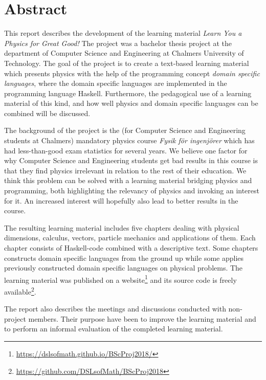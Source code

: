 \setlength{\parskip}{0.5cm}

\thispagestyle{plain}			%
\section*{Abstract}

This report describes the development of the learning material \textit{Learn You a Physics for Great Good!} The project was a bachelor thesis project at the department of Computer Science and Engineering at Chalmers University of Technology. The goal of the project is to create a text-based learning material which presents physics with the help of the programming concept \textit{domain specific languages}, where the domain specific languages are implemented in the programming language Haskell. Furthermore, the pedagogical use of a learning material of this kind, and how well physics and domain specific languages can be combined will be discussed.

The background of the project is the (for Computer Science and Engineering students at Chalmers) mandatory physics course \textit{Fysik för ingenjörer} which has had less-than-good exam statistics for several years. We believe one factor for why Computer Science and Engineering students get bad results in this course is that they find physics irrelevant in relation to the rest of their education. We think this problem can be solved with a learning material bridging physics and programming, both highlighting the relevancy of physics and invoking an interest for it. An increased interest will hopefully also lead to better results in the course.

The resulting learning material includes five chapters dealing with physical dimensions, calculus, vectors, particle mechanics and applications of them. Each chapter consists of Haskell-code combined with a descriptive text. Some chapters constructs domain specific languages from the ground up while some applies previously constructed domain specific languages on physical problems. The learning material was published on a website\footnote{\url{https://dslsofmath.github.io/BScProj2018/}} and its source code is freely available\footnote{\url{https://github.com/DSLsofMath/BScProj2018}}.

The report also describes the meetings and discussions conducted with non-project members. Their purpose have been to improve the learning material and to perform an informal evaluation of the completed learning material.

